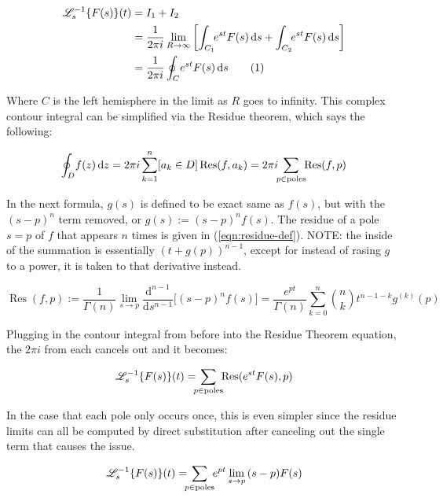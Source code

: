 \documentclass[12pt]{article}
\newcommand \dstyle \displaystyle
\newcommand \ILaplace [3] {\ensuremath{\mathscr{L}_{#1}^{-1}\!\left\{#2\right\}\!\left(#3\right)}}
\renewcommand \d [1] {\mathrm{d}{#1}}
\newcommand \ds {{\d s}}
\newcommand \dz {{\d z}}
\newcommand \ddn [2] {\dfrac{\mathrm{d}^{#2}}{\d{#1}^{#2}}}
\DeclareMathOperator \Res {Res}
\newcommand \numberthis {\addtocounter{equation}{1}\tag{\theequation}}
\begin{document}
\begin{align*}
	\ILaplace{s}{F(s)}{t}
		& = I_1 + I_2 \\
		& = \dfrac 1 {2 \pi i} \lim_{R \to \infty} \left[\int_{C_1} \!\! e^{st} F(s) \, \ds + \int_{C_2} \!\! e^{st} F(s) \, \ds\right] \\
		& = \dfrac 1 {2 \pi i} \oint_C \! e^{st} F(s) \, \ds \numberthis
\end{align*}

Where $C$ is the left hemisphere in the limit as $R$ goes to infinity. This complex contour integral can be simplified via the Residue theorem, which says the following:

 {}
\begin{equation*}\label{eqn:residue-thm}
	\oint_D \! f(z) \, \dz = 2 \pi i \sum_{k=1}^n [a_k \in D] \Res(f, a_k) = 2 \pi i \!\! \sum_{p \in \rm poles} \!\! \Res(f, p)
\end{equation*}

In the next formula, $g(s)$ is defined to be exact same as $f(s)$, but with the $(s - p)^n$ term removed, or $\dstyle g(s) := (s - p)^n f(s)$. The residue of a pole $s = p$ of $f$ that appears $n$ times is given in (\ref{eqn:residue-def}). NOTE: the inside of the summation is essentially $(t + g(p))^{n - 1}$, except for instead of rasing $g$ to a power, it is taken to that derivative instead.

\begin{equation}\label{eqn:residue-def}
	\Res(f, p) := \dfrac 1 {\Gamma(n)} \lim_{s \to p} \ddn s {n - 1} \Big[ (s - p)^n f(s) \Big]
	= \dfrac {e^{p t}} {\Gamma(n)} \sum_{k = 0}^n \binom n k t^{n - 1 - k} g^{(k)}(p)
\end{equation}

Plugging in the contour integral from before into the Residue Theorem equation, the $2 \pi i$ from each cancels out and it becomes:

\begin{equation}
	\ILaplace{s}{F(s)}{t} = \!\!\! \sum_{p \in {\rm poles}} \!\! \Res(e^{s t} F(s), p)
\end{equation}

In the case that each pole only occurs once, this is even simpler since the residue limits can all be computed by direct substitution after canceling out the single term that causes the issue.

\begin{equation}
	\ILaplace{s}{F(s)}{t} = \!\!\! \sum_{p \in {\rm poles}} \!\! e^{p t} \lim_{s \to p} \, (s - p) F(s)
\end{equation}
\end{document}
